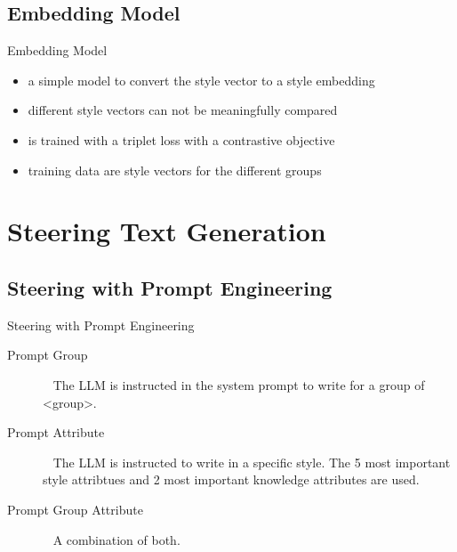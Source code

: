 \documentclass[]{beamer}
\begin{document}
\subsection{Embedding Model}
\begin{frame}{Embedding Model}
  \begin{itemize}
    \item a simple model to convert the style vector to a style embedding
    \item different style vectors can not be meaningfully compared
    \item is trained with a triplet loss with a contrastive objective
    \item training data are style vectors for the different groups
  \end{itemize}
\end{frame}


\section{Steering Text Generation}
\subsection{Steering with Prompt Engineering}
\begin{frame}{Steering with Prompt Engineering}
  \begin{description}
    \item[Prompt Group] ~\linebreak
          The LLM is instructed in the system prompt to write for a group of <group>.
    \item[Prompt Attribute] ~\linebreak
          The LLM is instructed to write in a specific style. The 5 most important style attribtues and 2 most important knowledge attributes are used.
    \item[Prompt Group Attribute] ~\linebreak
          A combination of both.
  \end{description}
\end{frame}
\end{document}
